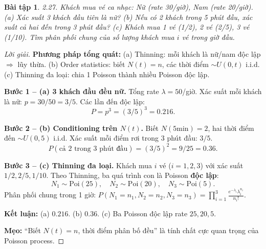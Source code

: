 \documentclass[8pt,a4paper]{article}
\newtheorem{exercise}{Bài tập}
\newenvironment{solution}{\begin{proof}[Lời giải]}{\end{proof}}
\begin{document}
\begin{exercise}
2.27. Khách mua vé ca nhạc: Nữ (rate 30/giờ), Nam (rate 20/giờ).
(a) Xác suất 3 khách đầu tiên là nữ?
(b) Nếu có 2 khách trong 5 phút đầu, xác suất cả hai đến trong 3 phút đầu?
(c) Khách mua 1 vé (1/2), 2 vé (2/5), 3 vé (1/10). Tìm phân phối chung của số lượng khách mua $i$ vé trong giờ đầu.
\end{exercise}
\begin{solution}
\textbf{Phương pháp tổng quát:} (a) Thinning: mỗi khách là nữ/nam độc lập $\Rightarrow$ lũy thừa. (b) Order statistics: biết $N(t) = n$, các thời điểm $\sim U(0,t)$ i.i.d. (c) Thinning đa loại: chia 1 Poisson thành nhiều Poisson độc lập.

\textbf{Bước 1 -- (a) 3 khách đầu đều nữ.} Tổng rate $\lambda = 50$/giờ. Xác suất mỗi khách là nữ: $p = 30/50 = 3/5$. Các lần đến độc lập:
\[
  P = p^3 = (3/5)^3 = \boxed{0.216}.
\]

\textbf{Bước 2 -- (b) Conditioning trên $N(t)$.} Biết $N(5\text{min}) = 2$, hai thời điểm đến $\sim U(0,5)$ i.i.d. Xác suất mỗi điểm rơi trong 3 phút đầu: $3/5$.
\[
  P(\text{cả 2 trong 3 phút đầu}) = (3/5)^2 = \boxed{9/25 = 0.36}.
\]

\textbf{Bước 3 -- (c) Thinning đa loại.} Khách mua $i$ vé ($i = 1, 2, 3$) với xác suất $1/2, 2/5, 1/10$. Theo Thinning, ba quá trình con là Poisson \textbf{độc lập}:
\[
  N_1 \sim \text{Poi}(25), \quad N_2 \sim \text{Poi}(20), \quad N_3 \sim \text{Poi}(5).
\]
Phân phối chung trong 1 giờ: $P(N_1=n_1, N_2=n_2, N_3=n_3) = \prod_{i=1}^3 \frac{e^{-\lambda_i}\lambda_i^{n_i}}{n_i!}$.

\textbf{Kết luận:} (a) $0.216$. (b) $0.36$. (c) Ba Poisson độc lập rate $25, 20, 5$.

\textbf{Mẹo:} ``Biết $N(t)=n$, thời điểm phân bố đều'' là tính chất cực quan trọng của Poisson process.
\end{solution}
\end{document}
